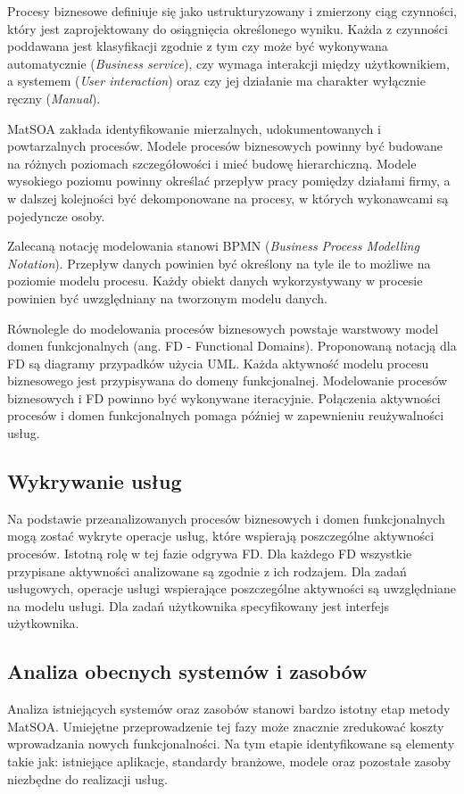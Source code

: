 Procesy biznesowe definiuje się jako ustrukturyzowany i zmierzony ciąg czynności, który jest zaprojektowany do osiągnięcia określonego wyniku. \cite{PlatIntGor} Każda z czynności poddawana jest klasyfikacji zgodnie z tym czy może być wykonywana automatycznie (\emph{Business service}), czy wymaga interakcji między użytkownikiem, a systemem (\emph{User interaction}) oraz czy jej działanie ma charakter wyłącznie ręczny (\emph{Manual}).

MatSOA zakłada identyfikowanie mierzalnych, udokumentowanych i powtarzalnych procesów. Modele procesów biznesowych powinny być budowane na różnych poziomach szczegółowości i mieć budowę hierarchiczną. Modele wysokiego poziomu powinny określać przepływ pracy pomiędzy działami firmy, a w dalszej kolejności być dekomponowane na procesy, w których wykonawcami są pojedyncze osoby. 

Zalecaną notację modelowania stanowi BPMN (\emph{Business Process Modelling Notation}). Przepływ danych powinien być określony na tyle ile to możliwe na poziomie modelu procesu. Każdy obiekt danych wykorzystywany w procesie powinien być uwzględniany na tworzonym modelu danych.

Równolegle do modelowania procesów biznesowych powstaje warstwowy model domen funkcjonalnych (ang. {FD - Functional Domains}). Proponowaną notacją dla FD są diagramy przypadków użycia UML. Każda aktywność modelu procesu biznesowego jest przypisywana do domeny funkcjonalnej. Modelowanie procesów biznesowych i FD powinno być wykonywane iteracyjnie. Połączenia aktywności procesów i domen funkcjonalnych pomaga później w zapewnieniu reużywalności usług.

\subsection*{Wykrywanie usług}
Na podstawie przeanalizowanych procesów biznesowych i domen funkcjonalnych mogą zostać wykryte operacje usług, które wspierają poszczególne aktywności procesów. Istotną rolę w tej fazie odgrywa FD. Dla każdego FD wszystkie przypisane aktywności analizowane są zgodnie z ich rodzajem. Dla zadań usługowych, operacje usługi wspierające poszczególne aktywności są uwzględniane na modelu usługi. Dla zadań użytkownika specyfikowany jest interfejs użytkownika.

\subsection*{Analiza obecnych systemów i zasobów}
Analiza istniejących systemów oraz zasobów stanowi bardzo istotny etap metody MatSOA. Umiejętne przeprowadzenie tej fazy może znacznie zredukować koszty wprowadzania nowych funkcjonalności. Na tym etapie identyfikowane są elementy takie jak: istniejące aplikacje, standardy branżowe, modele oraz pozostałe zasoby niezbędne do realizacji usług. 

